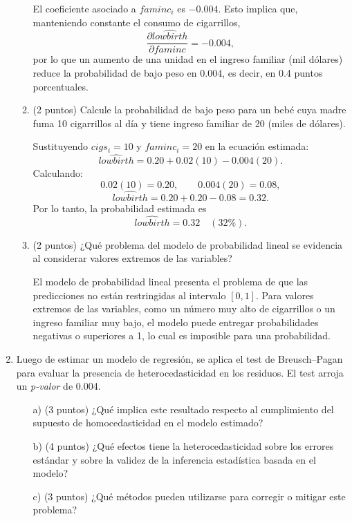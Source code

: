 \documentclass[10pt,a4paper]{article}
\begin{document}
\begin{enumerate}
\begin{enumerate}
    \color{blue}
El coeficiente asociado a $faminc_i$ es $-0.004$. Esto implica que,
    manteniendo constante el consumo de cigarrillos,
    \[
        \frac{\partial \widehat{lowbirth}}{\partial faminc} = -0.004,
    \]
    por lo que un aumento de una unidad en el ingreso familiar (mil dólares)
    reduce la probabilidad de bajo peso en 0.004, es decir, en 0.4 puntos
    porcentuales.
\color{black}
    \item (2 puntos)  Calcule la probabilidad de bajo peso para un bebé cuya madre fuma 10 cigarrillos al día y tiene ingreso familiar de 20 (miles de dólares).

    \color{blue}
Sustituyendo $cigs_i = 10$ y $faminc_i = 20$ en la ecuación estimada:
    \[
        \widehat{lowbirth}
        = 0.20 + 0.02(10) - 0.004(20).
    \]
    Calculando:
    \[
        0.02(10) = 0.20, \qquad 0.004(20) = 0.08,
    \]
    \[
        \widehat{lowbirth} = 0.20 + 0.20 - 0.08 = 0.32.
    \]
    Por lo tanto, la probabilidad estimada es
    \[
        \widehat{lowbirth} = 0.32 \quad (32\%).
    \]

\color{black}
    \item (2 puntos)  ¿Qué problema del modelo de probabilidad lineal se evidencia al considerar valores extremos de las variables?

\color{blue}
El modelo de probabilidad lineal presenta el problema de que las
    predicciones no están restringidas al intervalo $[0,1]$. Para valores
    extremos de las variables, como un número muy alto de cigarrillos o un
    ingreso familiar muy bajo, el modelo puede entregar probabilidades
    negativas o superiores a 1, lo cual es imposible para una probabilidad.
\color{black}
\end{enumerate}
    
       \item Luego de estimar un modelo de regresión, se aplica el test de Breusch--Pagan para evaluar la presencia de heterocedasticidad en los residuos. El test arroja un \textit{p-valor} de 0.004.

\begin{enumerate}
  \item[a)] (3 puntos) ¿Qué implica este resultado respecto al cumplimiento del supuesto de homocedasticidad en el modelo estimado?
  \item[b)] (4 puntos) ¿Qué efectos tiene la heterocedasticidad sobre los errores estándar y sobre la validez de la inferencia estadística basada en el modelo?
  \item[c)] (3 puntos) ¿Qué métodos pueden utilizarse para corregir o mitigar este problema?
\end{enumerate}




\end{enumerate}
\end{document}
